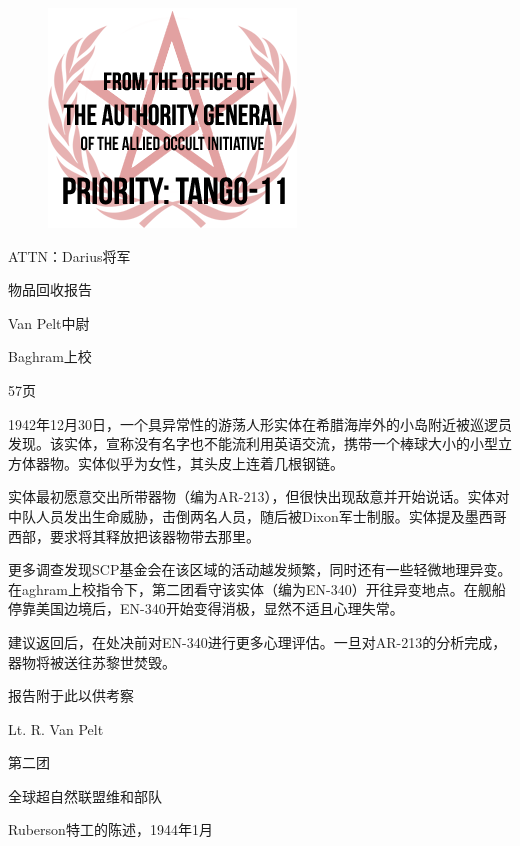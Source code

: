 \begin{tcolorbox}[colframe=black, boxrule=0.5pt, colback=white, center upper, leftright skip=0.12\linewidth, breakable]

\begin{figure}[H]
	\centering
	\includegraphics[width=0.6\linewidth]{images/SCP.001.the.broken.god.8.png}
\end{figure}

ATTN：Darius将军

物品回收报告

Van Pelt中尉

Baghram上校

57页

1942年12月30日，一个具异常性的游荡人形实体在希腊海岸外的小岛附近被巡逻员发现。该实体，宣称没有名字也不能流利用英语交流，携带一个棒球大小的小型立方体器物。实体似乎为女性，其头皮上连着几根钢链。

实体最初愿意交出所带器物（编为AR-213），但很快出现敌意并开始说话。实体对中队人员发出生命威胁，击倒两名人员，随后被Dixon军士制服。实体提及墨西哥西部，要求将其释放把该器物带去那里。

更多调查发现SCP基金会在该区域的活动越发频繁，同时还有一些轻微地理异变。在aghram上校指令下，第二团看守该实体（编为EN-340）开往异变地点。在舰船停靠美国边境后，EN-340开始变得消极，显然不适且心理失常。

建议返回后，在处决前对EN-340进行更多心理评估。一旦对AR-213的分析完成，器物将被送往苏黎世焚毁。

报告附于此以供考察

Lt. R. Van Pelt

第二团

全球超自然联盟维和部队

\end{tcolorbox}

Ruberson特工的陈述，1944年1月


